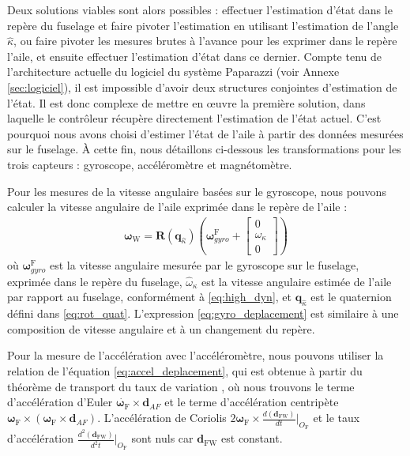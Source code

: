 Deux solutions viables sont alors possibles : effectuer l'estimation d'état dans le repère du fuselage et faire pivoter l'estimation en utilisant l'estimation de l'angle $\hat{\kappa}$, ou faire pivoter les mesures brutes à l'avance pour les exprimer dans le repère l'aile, et ensuite effectuer l'estimation d'état dans ce dernier. 
Compte tenu de l'architecture actuelle du logiciel du système Paparazzi (voir Annexe \ref{sec:logiciel}), il est impossible d'avoir deux structures conjointes d'estimation de l'état. Il est donc complexe de mettre en œuvre la première solution, dans laquelle le contrôleur récupère directement l'estimation de l'état actuel. C'est pourquoi nous avons choisi d'estimer l'état de l'aile à partir des données mesurées sur le fuselage. À cette fin, nous détaillons ci-dessous les transformations pour les trois capteurs : gyroscope, accéléromètre et magnétomètre. 

Pour les mesures de la vitesse angulaire basées sur le gyroscope, nous pouvons calculer la vitesse angulaire de l'aile exprimée dans le repère de l'aile :
\begin{align}
    \label{eq:gyro_deplacement}
    \boldsymbol{\omega}_{\text{W}} = \boldsymbol{R}(\boldsymbol{q}_{\hat{\kappa}}) \left( \boldsymbol{\omega}_{gyro}^{\text{F}} + \begin{bmatrix}
    0\\ \omega_{\kappa} \\ 0
    \end{bmatrix}  \right) 
\end{align}
où $\boldsymbol{\omega}_{gyro}^{\text{F}}$ est la vitesse angulaire mesurée par le gyroscope sur le fuselage, exprimée dans le repère du fuselage, $\hat{\omega}_{\kappa}$ est la vitesse angulaire estimée de l'aile par rapport au fuselage, conformément à \eqref{eq:high_dyn}, et $\boldsymbol{q}_{\hat{\kappa}}$ est le quaternion défini dans \eqref{eq:rot_quat}.
L'expression \eqref{eq:gyro_deplacement} est similaire à une composition de vitesse angulaire et à un changement du repère.

Pour la mesure de l'accélération avec l'accéléromètre, nous pouvons utiliser la relation de l'équation \eqref{eq:accel_deplacement}, qui est obtenue à partir du théorème de transport du taux de variation \cite{brizard2004motion}, où nous trouvons le terme d'accélération d'Euler $\dot{\boldsymbol{\omega}_{\text{F}}} \times \boldsymbol{d}_{AF}$  et le terme d'accélération centripète $\boldsymbol{\omega}_{\text{F}} \times ( \boldsymbol{\omega}_{\text{F}} \times  \boldsymbol{d}_{AF})$. L'accélération de Coriolis $2\boldsymbol{\omega}_{\text{F}} \times \frac{d (\boldsymbol{d}_{\text{FW}})}{d t}\Bigr|_{O_{\text{F}}}$ et le taux d'accélération $\frac{d^{2} (\boldsymbol{d}_{\text{FW}})}{d^{2} t}\Bigr|_{O_{\text{F}}}$ sont nuls car $\boldsymbol{d}_{\text{FW}}$ est constant.

